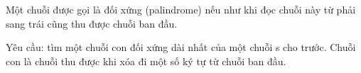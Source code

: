 Một chuỗi được gọi là đối xứng (palindrome) nếu như khi đọc chuỗi này từ phải sang trái cũng thu được chuỗi ban đầu.  

   Yêu cầu: tìm một chuỗi con đối xứng dài nhất của một chuỗi s cho trước. Chuỗi con là chuỗi thu được khi xóa đi một số ký tự từ chuỗi ban đầu.